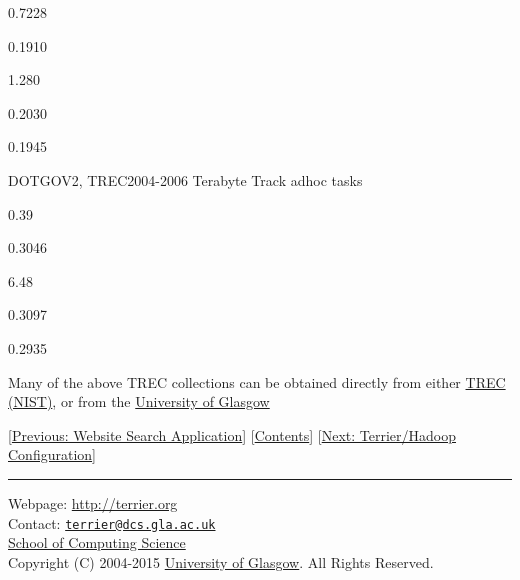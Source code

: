0.7228

0.1910

1.280

0.2030

0.1945

DOTGOV2, TREC2004-2006 Terabyte Track adhoc tasks

0.39

0.3046

6.48

0.3097

0.2935

Many of the above TREC collections can be obtained directly from either
\href{http://trec.nist.gov}{TREC (NIST)}, or from the
\href{http://ir.dcs.gla.ac.uk/test_collections/}{University of Glasgow}

{[}\href{website_search.html}{Previous: Website Search Application}{]}
{[}\href{index.html}{Contents}{]}
{[}\href{hadoop_configuration.html}{Next: Terrier/Hadoop
Configuration}{]}

\begin{center}\rule{0.5\linewidth}{\linethickness}\end{center}

Webpage: \url{http://terrier.org}\\
Contact:
\href{mailto:terrier@dcs.gla.ac.uk}{\nolinkurl{terrier@dcs.gla.ac.uk}}\\
\href{http://www.dcs.gla.ac.uk/}{School of Computing Science}\\
Copyright (C) 2004-2015 \href{http://www.gla.ac.uk/}{University of
Glasgow}. All Rights Reserved.
